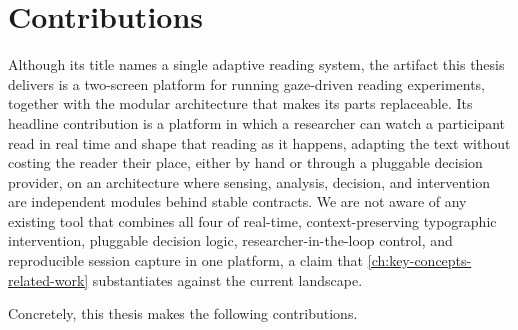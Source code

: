 \section{Contributions}
\label{sec:contributions}

Although its title names a single adaptive reading system, the artifact this thesis delivers is a two-screen platform for running gaze-driven reading experiments, together with the modular architecture that makes its parts replaceable.
Its headline contribution is a platform in which a researcher can watch a participant read in real time and shape that reading as it happens, adapting the text without costing the reader their place, either by hand or through a pluggable decision provider, on an architecture where sensing, analysis, decision, and intervention are independent modules behind stable contracts.
We are not aware of any existing tool that combines all four of real-time, context-preserving typographic intervention, pluggable decision logic, researcher-in-the-loop control, and reproducible session capture in one platform, a claim that \cref{ch:key-concepts-related-work} substantiates against the current landscape.

Concretely, this thesis makes the following contributions.


